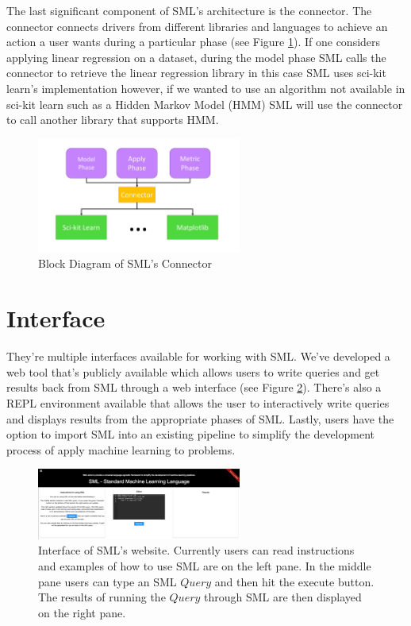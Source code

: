 \documentclass[jair,twoside,11pt,theapa]{article}
\begin{document}
The last significant component of SML's architecture is the connector. The connector connects drivers from different libraries and languages to achieve an action a user wants during a particular phase (see Figure \ref{fig:SML:Connector}). If one considers applying linear regression on a dataset, during the model phase SML calls the connector to retrieve the linear regression library in this case SML uses sci-kit learn's implementation however, if we wanted to use an algorithm not available in sci-kit learn such as a Hidden Markov Model (HMM) SML will use the connector to call another library that supports HMM.

\begin{figure}
\includegraphics[width=0.6\textwidth]{figs/connector.png}
\centering
\caption{Block Diagram of SML's Connector}
\label{fig:SML:Connector}
\end{figure}

\section{Interface}
\label{interface}

They're multiple interfaces available for working with SML. We've developed a web tool that's publicly available which allows users to write queries and get results back from SML through a web interface (see Figure \ref{fig:SML:website}). There's also a REPL environment available that allows the user to interactively write queries and displays results from the appropriate phases of SML. Lastly, users have the option to import SML into an existing pipeline to simplify the development process of apply machine learning to problems.

\begin{figure}
\includegraphics[width=0.6\textwidth]{figs/sml-web-site.png}
\centering
\caption{Interface of SML's website. Currently users can read instructions and examples of how to use SML are on the left pane. In the middle pane users can type an SML \(Query\) and then hit the execute button. The results of running the \(Query\) through SML are then displayed on the right pane.}
\label{fig:SML:website}
\end{figure}
\end{document}
